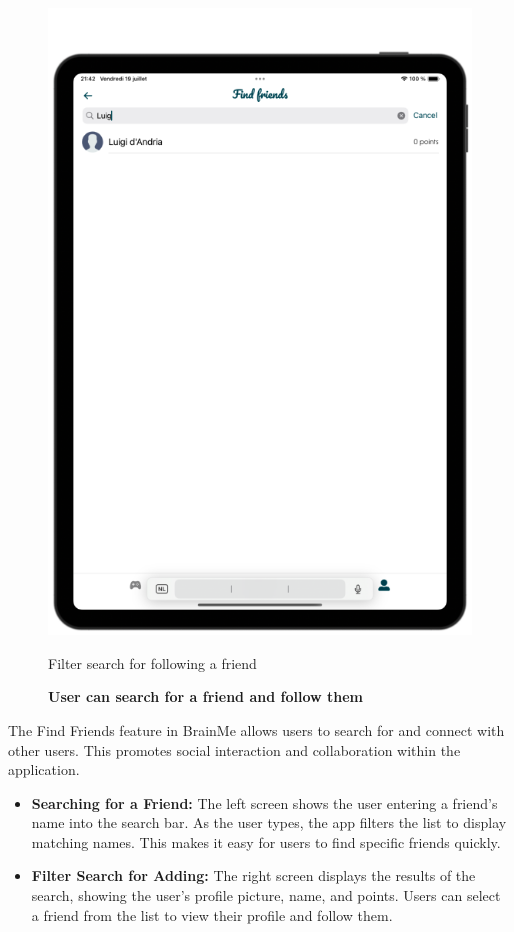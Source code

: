 \begin{figure}[H]
    \hspace{0.1\linewidth}
    \begin{minipage}[b]{0.43\linewidth}
        \centering
        \includegraphics[width=\linewidth]{TabletUI/Filter search for following a friend.png}
        \caption{Filter search for following a friend}
    \end{minipage}
    \vspace{0.5cm}
    \caption{\textbf{User can search for a friend and follow them}}
\end{figure}

The Find Friends feature in BrainMe allows users to search for and connect with other users. This promotes social interaction and collaboration within the application.

\begin{itemize}
\item \textbf{Searching for a Friend:} The left screen shows the user entering a friend's name into the search bar. As the user types, the app filters the list to display matching names. This makes it easy for users to find specific friends quickly.
\item \textbf{Filter Search for Adding:} The right screen displays the results of the search, showing the user’s profile picture, name, and points. Users can select a friend from the list to view their profile and follow them.
\end{itemize}


